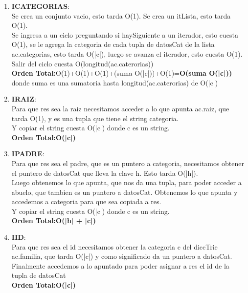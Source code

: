 \documentclass[10pt, a4paper]{article}
\begin{document}
    \begin{enumerate}
     \item \textbf{ICATEGORIAS}:\\ Se crea un conjunto vacio, esto tarda O(1). Se crea un itLista, esto tarda O(1). \\ Se ingresa a un ciclo preguntando si haySiguiente a un iterador, esto cuesta O(1), se le agrega la categoria de cada tupla de datosCat de la lista ac.categorias, esto tarda O(|c|), luego se avanza el iterador, esto cuesta O(1).\\ Salir del ciclo cuesta O(longitud(ac.caterorias)) \\
	\textbf{Orden Total:}O(1)+O(1)+O(1)+(suma O(|c|))+O(1)=\textbf{O(suma O(|c|))} donde suma es una sumatoria hasta longitud(ac.caterorias) de O(|c|)
      
     \item \textbf{IRAIZ}:\\ Para que res sea la raiz necesitamos acceder a lo que apunta ac.raiz, que tarda O(1), y es una tupla que tiene el string categoria.\\ Y copiar el string cuesta O(|c|) donde c es un string. \\
	\textbf{Orden Total:}\textbf{O(|c|)}

     \item \textbf{IPADRE}:\\ Para que res sea el padre, que es un puntero a categoria, necesitamos obtener el puntero de datosCat que lleva la clave h. Esto tarda O(|h|). \\ Luego obtenemos lo que apunta, que nos da una tupla, para poder acceder a abuelo, que tambien es un puntero a datosCat. Obtenemos lo que apunta y accedemos a categoria para que sea copiada a res. \\ Y copiar el string cuesta O(|c|) donde c es un string. \\
	\textbf{Orden Total:}\textbf{O(|h| + |c|)}

     \item \textbf{IID}:\\ Para que res sea el id necesitamos obtener la categoria c del diccTrie ac.familia, que tarda O(|c|) y como significado da un puntero a datosCat. \\ Finalmente accedemos a lo apuntado para poder asignar a res el id de la tupla de datosCat\\
	\textbf{Orden Total:}\textbf{O(|c|)}
      

\end{enumerate}
\end{document}
